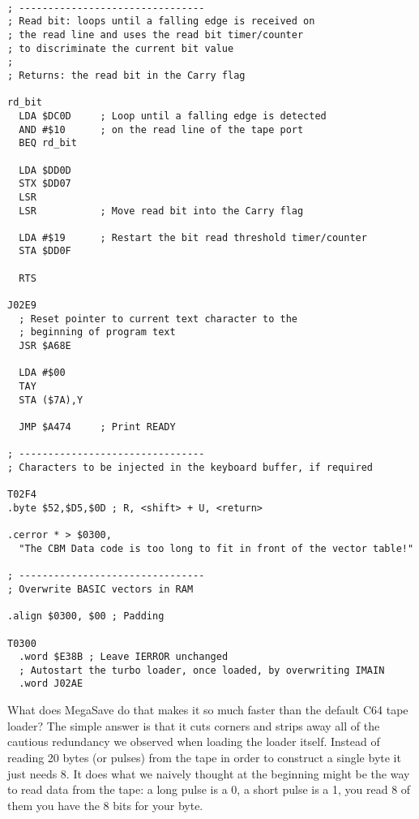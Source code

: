 \begin{minipage}[b]{0.50\linewidth}
\centering
\begin{lstlisting}[basicstyle=\tiny\ttfamily]

; --------------------------------
; Read bit: loops until a falling edge is received on
; the read line and uses the read bit timer/counter
; to discriminate the current bit value
;
; Returns: the read bit in the Carry flag

rd_bit
  LDA $DC0D     ; Loop until a falling edge is detected
  AND #$10      ; on the read line of the tape port
  BEQ rd_bit       

  LDA $DD0D     
  STX $DD07     
  LSR           
  LSR           ; Move read bit into the Carry flag

  LDA #$19      ; Restart the bit read threshold timer/counter
  STA $DD0F     

  RTS           

J02E9
  ; Reset pointer to current text character to the
  ; beginning of program text
  JSR $A68E 

  LDA #$00      
  TAY           
  STA ($7A),Y   

  JMP $A474     ; Print READY

; --------------------------------
; Characters to be injected in the keyboard buffer, if required

T02F4
.byte $52,$D5,$0D ; R, <shift> + U, <return>

.cerror * > $0300,
  "The CBM Data code is too long to fit in front of the vector table!"

; --------------------------------
; Overwrite BASIC vectors in RAM

.align $0300, $00 ; Padding

T0300
  .word $E38B ; Leave IERROR unchanged
  ; Autostart the turbo loader, once loaded, by overwriting IMAIN
  .word J02AE 
\end{lstlisting}
\end{minipage}

What does MegaSave do that makes it so much faster than the default C64 tape loader? The simple answer is that it cuts corners
and strips away all of the cautious redundancy we observed when loading the loader itself. Instead of reading 20 bytes (or pulses)
from the tape in order to construct a single byte it just needs 8. It does what we naively thought at the beginning might be
the way to read data from the tape: a long pulse is a 0, a short pulse is a 1, you read 8 of them you have the 8 bits for your
byte.

